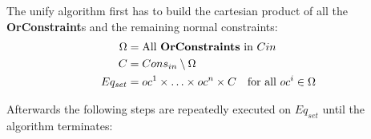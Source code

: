The unify algorithm first has to build the cartesian product of all the \textbf{OrConstraint}s and the remaining normal constraints:
\begin{align*}
\Omega &= \text{All }\mathbf{OrConstraints} \text{ in } C{in}\\
C &= {Cons}_{in} \setminus \Omega \\
Eq_{set} &= oc^1 \times \ldots \times oc^n \times C \quad \text{for all }oc^i \in \Omega
\end{align*}

Afterwards the following steps are repeatedly executed on $Eq_{set}$ until the algorithm terminates:

